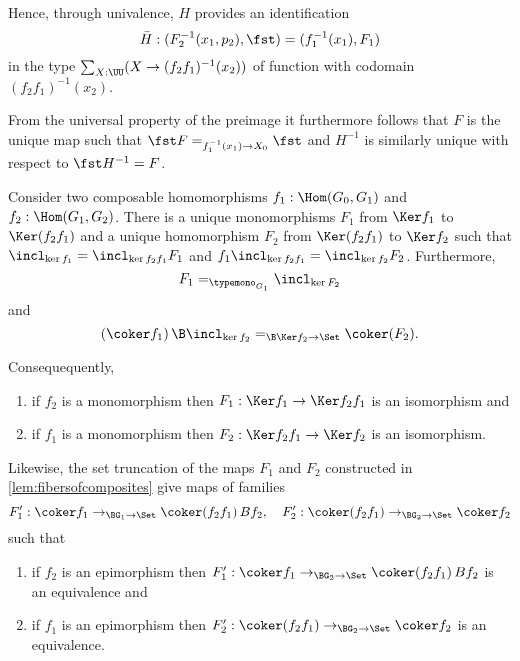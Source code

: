 Hence, through univalence, $H$ provides an identification
  $$\bar H:(F_2^{-1}(x_1,p_2),\fst)=(f_1^{-1}(x_1),F_1)$$ in the type $\sum_{X:\UU}(X\to(f_2f_1)^{-1}(x_2))$ of function with codomain $(f_2f_1)^{-1}(x_2)$.
  
From the universal property of the preimage it furthermore follows that $F$ is the unique map such that $\fst F=_{f_1^{-1}(x_1)\to X_0}\fst$ and $H^{-1}$ is similarly unique with respect to $\fst H^{-1}=F$.

\begin{corollary}
  \label{cor:cokermaps}
  Consider two composable homomorphisms $f_1:\Hom(G_0,G_1)$ and $f_2:\Hom(G_1,G_2)$.
  There is a unique monomorphisms $F_1$ from $\Ker f_1$ to $\Ker(f_2f_1)$
  and a unique homomorphism $F_2$ from $\Ker(f_2f_1)$ to $\Ker f_2$ such that $\incl_{\ker f_1}=\incl_{\ker f_2f_1}F_1$ and $f_1\incl_{\ker f_2f_1}=\incl_{\ker f_2}F_2$.
  Furthermore, $$F_1=_{\typemono_{G_1}}\incl_{\ker F_2}$$ and $$(\coker f_1)\,\B\incl_{\ker f_2}=_{\B\Ker f_2\to\Set}\coker (F_2).$$

  Consequequently,
  \begin{enumerate}
  \item if $f_2$ is a monomorphism then $F_1:\Ker f_1\to\Ker f_2f_1$ is an isomorphism and
  \item if $f_1$ is a monomorphism then $F_2:\Ker f_2f_1\to\Ker f_2$ is an isomorphism.
  \end{enumerate}
Likewise, the set truncation of the maps $F_1$ and $F_2$ constructed in \cref{lem:fibersofcomposites} give maps  of families
$$F_1':\coker f_1\to_{\BG_1\to\Set}\coker(f_2f_1)\,Bf_2,\quad F_2':\coker(f_2f_1)\to_{\BG_2\to\Set}\coker f_2$$
  such that
  \begin{enumerate}
  \item if $f_2$ is an epimorphism then $F_1':\coker f_1\to_{\BG_2\to\Set}\coker(f_2f_1)\,Bf_2$ is an equivalence and
  \item if $f_1$ is an epimorphism then $F_2':\coker(f_2f_1)\to_{\BG_2\to\Set}\coker f_2$  is an equivalence.
  \end{enumerate}
\end{corollary}
